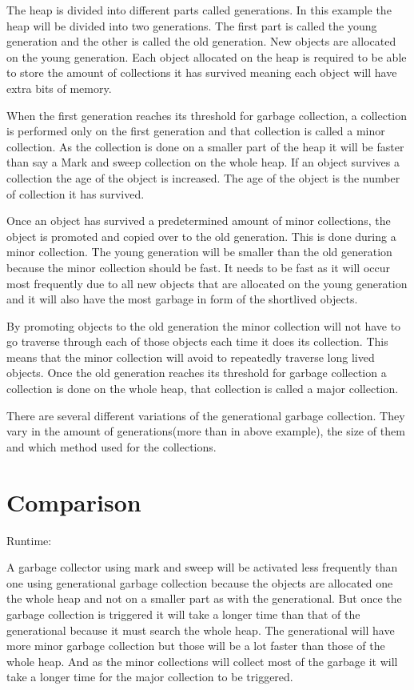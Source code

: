 \documentclass[11pt, a4paper]{article}
\begin{document}
The heap is divided into different parts called generations. In this example the heap will be divided into two generations. The first part is called the young generation and the other is called the old generation. New objects are allocated on the young generation. Each object allocated on the heap is required to be able to store the amount of collections it has survived meaning each object will have extra bits of memory\cite{rose}.

When the first generation reaches its threshold for garbage collection, a collection is performed only on the first generation and that collection is called a minor collection. As the collection is done on a smaller part of the heap it will be faster than say a Mark and sweep collection on the whole heap. If an object survives a collection the age of the object is increased. The age of the object is the number of collection it has survived\cite{rose}.

Once an object has survived a predetermined amount of minor collections, the object is promoted and copied over to the old generation. This is done during a minor collection.
The young generation will be smaller than the old generation because the minor collection should be fast. It needs to be fast as it will occur most frequently due to all new objects that are allocated on the young generation and it will also have the most garbage in form of the shortlived objects\cite{rose}.

By promoting objects to the old generation the minor collection will not have to go traverse through each of those objects each time it does its collection. This means that the minor collection will avoid to repeatedly traverse long lived objects\cite{hypo}.
Once the old generation reaches its threshold for garbage collection a collection is done on the whole heap, that collection is called a major collection.

There are several different variations of the generational garbage collection. They vary in the amount of generations(more than in above example), the size of them and which method used for the collections. 


\section{Comparison}

Runtime:

A garbage collector using mark and sweep will be activated less frequently than one using generational garbage collection because the objects are allocated one the whole heap and not on a smaller part as with the generational. But once the garbage collection is triggered it will take a longer time than that of the generational because it must search the whole heap. 
The generational will have more minor garbage collection but those will be a lot faster than those of the whole heap. And as the minor collections will collect most of the garbage it will take a longer time for the major collection to be triggered. 
\end{document}
